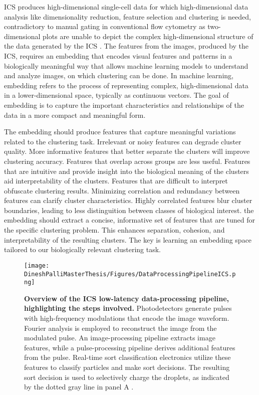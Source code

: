 \documentclass[12pt,a4paper]{article}
\begin{document}
ICS produces high-dimensional single-cell data for which high-dimensional data analysis like dimensionality reduction, feature selection and clustering is needed, contradictory to manual gating in conventional flow cytometry as two-dimensional plots are unable to depict the complex high-dimensional structure of the data generated by the ICS \cite{doi:10.1126/science.abj3013}. The features from the images, produced by the ICS, requires an embedding that encodes visual features and patterns in a biologically meaningful way that allows machine learning models to understand and analyze images, on which clustering can be done. In machine learning, embedding refers to the process of representing complex, high-dimensional data in a lower-dimensional space, typically as continuous vectors. The goal of embedding is to capture the important characteristics and relationships of the data in a more compact and meaningful form.

The embedding should produce features that capture meaningful variations related to the clustering task. Irrelevant or noisy features can degrade cluster quality. More informative features that better separate the clusters will improve clustering accuracy. Features that overlap across groups are less useful. Features that are intuitive and provide insight into the biological meaning of the clusters aid interpretability of the clusters. Features that are difficult to interpret obfuscate clustering results. Minimizing correlation and redundancy between features can clarify cluster characteristics. Highly correlated features blur cluster boundaries, leading to less distinguition between classes of biological interest. the embedding should extract a concise, informative set of features that are tuned for the specific clustering problem. This enhances separation, cohesion, and interpretability of the resulting clusters. The key is learning an embedding space tailored to our biologically relevant clustering task.

\begin{figure}
  \centering
  \texttt{[image: DineshPalliMasterThesis/Figures/DataProcessingPipelineICS.png]}
  \caption[ICS data processing pipeline illustrated]{\textbf{Overview of the ICS low-latency data-processing pipeline, highlighting the steps involved.} Photodetectors generate pulses with high-frequency modulations that encode the image waveform. Fourier analysis is employed to reconstruct the image from the modulated pulse. An image-processing pipeline extracts image features, while a pulse-processing pipeline derives additional features from the pulse. Real-time sort classification electronics utilize these features to classify particles and make sort decisions. The resulting sort decision is used to selectively charge the droplets, as indicated by the dotted gray line in panel A \cite{doi:10.1126/science.abj3013}.}
  \label{icsdataprocessing}
\end{figure}
\end{document}
